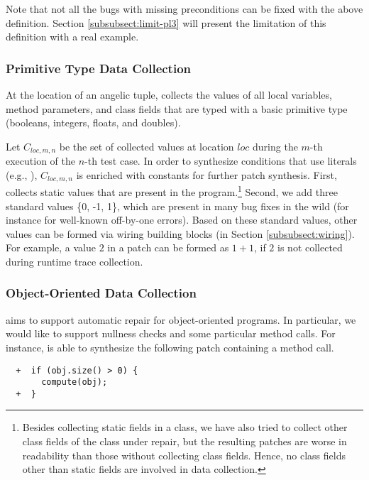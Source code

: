 Note that not all the bugs with missing preconditions can be fixed with the above definition. Section \ref{subsubsect:limit-pl3} will present the limitation of this definition with a real example.    

\subsubsection{Primitive Type Data Collection}
\label{subsect:primitive}

At the location of an angelic tuple, \nopol collects the values of all local variables, method parameters, and class fields that are typed with a basic primitive type (booleans, integers, floats, and doubles). 

Let $C_{loc,m,n}$ be the set of collected values at location $loc$ during the $m$-th execution of the $n$-th test case.
In order to synthesize conditions that use literals (e.g., ), $C_{loc,m,n}$ is enriched with constants for further patch synthesis.
First, \nopol collects static values that are present in the program.\footnote{Besides collecting static fields in a class, we have also tried to collect other class fields of the class under repair, but the resulting patches are worse in readability than those without collecting class fields. Hence, no class fields other than static fields are involved in data collection. } Second, we add three standard values  \{0, -1, 1\}, which are present in many bug fixes in  the wild (for instance for well-known off-by-one errors).
Based on these standard values, other values can be formed via wiring building blocks (in Section \ref{subsubsect:wiring}). For example, a value $2$ in a patch can be formed as $1+1$, if $2$ is not collected during runtime trace collection. 

\subsubsection{Object-Oriented Data Collection}
\label{subsubsect:oo}

\nopol aims to support automatic repair for object-oriented programs. 
In particular, we would like to support nullness checks and some particular method calls.
For instance, \nopol is able to synthesize the following patch containing a method call. 

\begin{lstlisting}
  +  if (obj.size() > 0) {
       compute(obj);
  +  }
\end{lstlisting}

